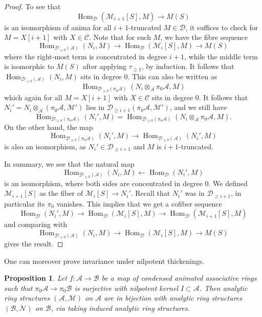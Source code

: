 \documentclass[11pt]{amsbook}
\DeclareMathOperator{\Hom}{Hom}
\numberwithin{equation}{section}
\numberwithin{theorem}{section}
\newtheorem{proposition}[theorem]{Proposition}
\theoremstyle{definition}
\begin{document}
\begin{proof}
To see that
\[
\Hom_{\mathcal D}(\mathcal M_{i+1}[S],M)\to M(S)
\]
is an isomorphism of anima for all $i+1$-truncated $M\in \mathcal D$, it suffices to check for $M=X[i+1]$ with $X\in \mathcal C$. Note that for such $M$, we have the fibre sequence
\[
\Hom_{\mathcal D_{\geq 0}(\mathcal A)}(N_i,M)\to \Hom_{\mathcal D}(\mathcal M_i[S],M)\to M(S)
\]
where the right-most term is concentrated in degree $i+1$, while the middle term is isomorphic to $M(S)$ after applying $\tau_{\geq 1}$, by induction. It follows that $\Hom_{\mathcal D_{\geq 0}(\mathcal A)}(N_i,M)$ sits in degree $0$. This can also be written as
\[
\Hom_{\mathcal D_{\geq 0}(\pi_0\mathcal A)}(N_i\otimes_{\mathcal A}\pi_0\mathcal A,M)
\]
which again for all $M=X[i+1]$ with $X\in \mathcal C$ sits in degree $0$. It follows that $N_i'=N_i\otimes_{\mathcal A} (\pi_0\mathcal A,\mathcal M')$ lies in $\mathcal D_{\geq i+1}(\pi_0\mathcal A,\mathcal M')$, and we still have
\[
\Hom_{\mathcal D_{\geq 0}(\pi_0\mathcal A)}(N_i',M) = \Hom_{\mathcal D_{\geq 0}(\pi_0\mathcal A)}(N_i\otimes_{\mathcal A}\pi_0\mathcal A,M).
\]
On the other hand, the map
\[
\Hom_{\mathcal D_{\geq 0}(\pi_0\mathcal A)}(N_i',M)\to \Hom_{\mathcal D_{\geq 0}(\mathcal A)}(N_i',M)
\]
is also an isomorphism, as $N_i'\in \mathcal D_{\geq i+1}$ and $M$ is $i+1$-truncated.

In summary, we see that the natural map
\[
\Hom_{\mathcal D_{\geq 0}(\mathcal A)}(N_i,M)\leftarrow \Hom_{\mathcal D}(N_i',M)
\]
is an isomorphism, where both sides are concentrated in degree $0$. We defined $\mathcal M_{i+1}[S]$ as the fiber of $\mathcal M_i[S]\to N_i'$. Recall that $N_i'$ was in $\mathcal D_{\geq i+1}$, in particular its $\pi_0$ vanishes. This implies that we get a cofiber sequence
\[
\Hom_{\mathcal D}(N_i',M)\to \Hom_{\mathcal D}(\mathcal M_i[S],M)\to \Hom_{\mathcal D}(\mathcal M_{i+1}[S],M)
\]
and comparing with
\[
\Hom_{\mathcal D_{\geq 0}(\mathcal A)}(N_i,M)\to \Hom_{\mathcal D}(\mathcal M_i[S],M)\to M(S)
\]
gives the result.
\end{proof}

One can moreover prove invariance under nilpotent thickenings.

\begin{proposition}\label{prop:nilinvariance} Let $f: \mathcal A\to \mathcal B$ be a map of condensed animated associative rings such that $\pi_0\mathcal A\to \pi_0\mathcal B$ is surjective with nilpotent kernel $I\subset \mathcal A$. Then analytic ring structures $(\mathcal A,\mathcal M)$ on $\mathcal A$ are in bijection with analytic ring structures $(\mathcal B,\mathcal N)$ on $\mathcal B$, via taking induced analytic ring structures.
\end{proposition}
\end{document}
